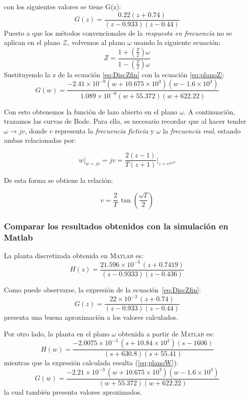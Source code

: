 con los siguientes valores se tiene G(z):
\begin{equation}
	G(z) = \frac{0.22(z+0.74)}{(z-0.933)(z-0.44)}
	\label{eq:DiscZfin}
\end{equation}
Puesto a que los métodos convencionales de la \emph{respuesta en frecuencia} no se aplican en el plano $\mathcal{Z}$, volvemos al plano $\omega$ usando la siguiente ecuación:
\begin{equation}
	Z = \frac{1+(\frac{T}{2})\omega}{1-(\frac{T}{2})\omega}
	\label{eq:planoZ}
\end{equation}
Sustituyendo la z de la ecuación \ref{eq:DiscZfin} con la ecuación \ref{eq:planoZ}:
\begin{equation}
	G(w) = \frac{-2.41 \times 10^{-9} (w +10.675 \times 10^{3})(w - 1.6 \times 10^{3})}{1.089 \times 10^{-6} (w + 55.372)(w + 622.22)}
	\label{eq:planoW}
\end{equation}

Con esto obtenemos la función de lazo abierto en el plano $\mathcal{\omega}$.  
A continuación, trazamos las curvas de Bode. Para ello, es necesario recordar que al hacer tender $\omega \rightarrow jv$, donde $v$ representa la \emph{frecuencia ficticia} y $\omega$ la \emph{frecuencia real}, estando ambas relacionadas por:

\begin{equation}
	w \big|_{w = jv} = jv = \frac{2(z-1)}{T(z+1)}\bigg|_{z = e^{j\omega T}}
	\label{Relavw}
\end{equation}

De esta forma se obtiene la relación:

\begin{equation}
	v = \frac{2}{T}\,\tan\!\left(\frac{\omega T}{2}\right)
\end{equation}

\subsubsection{Comparar los resultados obtenidos con la simulación en Matlab}

La planta discretizada obtenida en \textsc{Matlab} es:
\[
H(z) = \frac{21.596 \times 10^{-3}\,(z + 0.7419)}{(z - 0.9333)(z - 0.436)} 
\]

Como puede observarse, la expresión de la ecuación~\ref{eq:DiscZfin}:
\[
G(z) = \frac{22 \times 10^{-3}\,(z + 0.74)}{(z - 0.933)(z - 0.44)} 
\]
presenta una buena aproximación a los valores calculados.

Por otro lado, la planta en el plano $\mathcal{\omega}$ obtenida a partir de \textsc{Matlab} es:
\[
H(w) = \frac{-2.0075 \times 10^{-3}\,(s + 10.84 \times 10^{3})(s - 1606)}{(s + 630.8)(s + 55.41)} 
\]
mientras que la expresión calculada resulta (\ref{eq:planoW}):
\[
G(w) = \frac{-2.21 \times 10^{-3}\,(w + 10.675 \times 10^{3})(w - 1.6 \times 10^{3})}{(w + 55.372)(w + 622.22)} 
\]
la cual también presenta valores aproximados.
